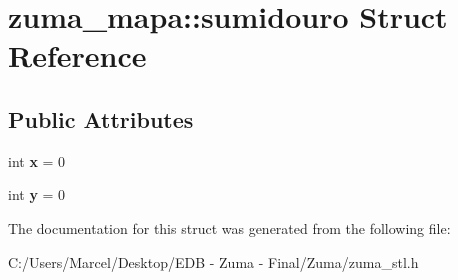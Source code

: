 \hypertarget{structzuma__mapa_1_1sumidouro}{\section{zuma\-\_\-mapa\-:\-:sumidouro Struct Reference}
\label{structzuma__mapa_1_1sumidouro}
}
\subsection*{Public Attributes}
\begin{DoxyCompactItemize}
\item 
\hypertarget{structzuma__mapa_1_1sumidouro_af54bf939522117ecae70e9f05e26a20e}{int {\bfseries x} = 0}\label{structzuma__mapa_1_1sumidouro_af54bf939522117ecae70e9f05e26a20e}

\item 
\hypertarget{structzuma__mapa_1_1sumidouro_a2a396700cde13e83bd9feeee095f8568}{int {\bfseries y} = 0}\label{structzuma__mapa_1_1sumidouro_a2a396700cde13e83bd9feeee095f8568}

\end{DoxyCompactItemize}


The documentation for this struct was generated from the following file\-:\begin{DoxyCompactItemize}
\item 
C\-:/\-Users/\-Marcel/\-Desktop/\-E\-D\-B -\/ Zuma -\/ Final/\-Zuma/zuma\-\_\-stl.\-h\end{DoxyCompactItemize}

